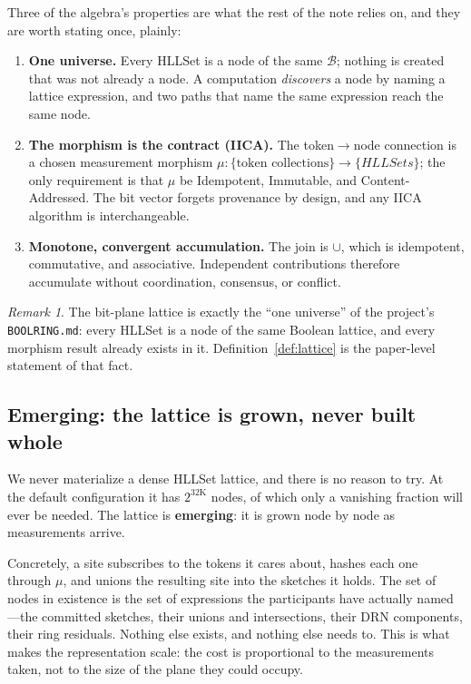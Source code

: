 \documentclass[11pt,a4paper]{article}
\theoremstyle{remark}
\newtheorem{remark}[theorem]{Remark}
\newcommand{\Lat}{\ensuremath{\mathcal{B}}}         %
\begin{document}
Three of the algebra's properties are what the rest of the note relies on, and
they are worth stating once, plainly:
\begin{enumerate}[leftmargin=*,nosep]
  \item \textbf{One universe.} Every HLLSet is a node of the same $\Lat$;
    nothing is created that was not already a node. A computation
    \emph{discovers} a node by naming a lattice expression, and two paths that
    name the same expression reach the same node.
  \item \textbf{The morphism is the contract (IICA).} The token$\to$node
    connection is a chosen measurement morphism
    $\mu:\{\text{token collections}\}\to\{HLLSets\}$; the only requirement is
    that $\mu$ be Idempotent, Immutable, and Content-Addressed. The bit vector
    forgets provenance by design, and any IICA algorithm is interchangeable.
  \item \textbf{Monotone, convergent accumulation.} The join is $\cup$, which is
    idempotent, commutative, and associative. Independent contributions
    therefore accumulate without coordination, consensus, or conflict.
\end{enumerate}

\begin{remark}
The bit-plane lattice is exactly the ``one universe'' of the project's
\texttt{BOOLRING.md}: every HLLSet is a node of the same Boolean lattice, and
every morphism result already exists in it. Definition~\ref{def:lattice} is the
paper-level statement of that fact.
\end{remark}

\subsection{Emerging: the lattice is grown, never built whole}
\label{sec:emerging}

We never materialize a dense HLLSet lattice, and there is no reason to try. At
the default configuration it has $2^{32\mathrm{K}}$ nodes, of which only a
vanishing fraction will ever be needed. The lattice is \textbf{emerging}: it is
grown node by node as measurements arrive.

Concretely, a site subscribes to the tokens it cares about, hashes each one
through $\mu$, and unions the resulting site into the sketches it holds. The
set of nodes in existence is the set of expressions the participants have
actually named---the committed sketches, their unions and intersections, their
DRN components, their ring residuals. Nothing else exists, and nothing else
needs to. This is what makes the representation scale: the cost is proportional
to the measurements taken, not to the size of the plane they could occupy.
\end{document}
